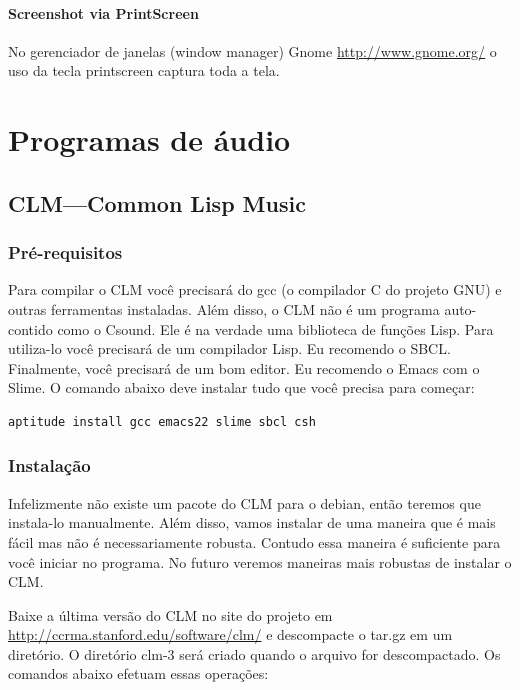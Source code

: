 \documentclass[12pt,brazil]{book}
\begin{document}
\subsection{Screenshot via PrintScreen}
\label{sec:scre-via-printscr}

No gerenciador de janelas (window manager) Gnome
\url{http://www.gnome.org/} o uso da tecla printscreen captura toda a
tela.

\part{Programas de áudio}
\label{part:programas-de-audio}

\chapter{CLM---Common Lisp Music}
\label{cha:clm-common-lisp}

\section{Pré-requisitos}
\label{sec:pre-requisitos}

Para compilar o CLM você precisará do gcc (o compilador C do projeto
GNU) e outras ferramentas instaladas. Além disso, o CLM não é um
programa auto-contido como o Csound. Ele é na verdade uma biblioteca
de funções Lisp. Para utiliza-lo você precisará de um compilador Lisp.
Eu recomendo o SBCL. Finalmente, você precisará de um bom editor. Eu
recomendo o Emacs com o Slime. O comando abaixo deve instalar tudo que
você precisa para começar:

\begin{verbatim}
aptitude install gcc emacs22 slime sbcl csh
\end{verbatim}

\section{Instalação}
\label{sec:instalacao}

Infelizmente não existe um pacote do CLM para o debian, então teremos
que instala-lo manualmente. Além disso, vamos instalar de uma maneira
que é mais fácil mas não é necessariamente robusta. Contudo essa
maneira é suficiente para você iniciar no programa. No futuro veremos
maneiras mais robustas de instalar o CLM.

Baixe a última versão do CLM no site do projeto em
\url{http://ccrma.stanford.edu/software/clm/} e descompacte o tar.gz
em um diretório. O diretório clm-3 será criado quando o arquivo for
descompactado. Os comandos abaixo efetuam essas operações:
\end{document}
